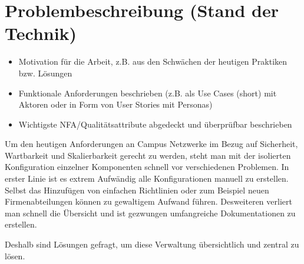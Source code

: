 \section{Problembeschreibung (Stand der Technik)}

\begin{itemize}	
	\item Motivation für die Arbeit, z.B. aus den Schwächen der heutigen Praktiken bzw. Lösungen
	\item Funktionale Anforderungen beschrieben (z.B. als Use Cases (short) mit Aktoren oder in Form von User Stories mit Personas)
	\item Wichtigste NFA/Qualitätsattribute abgedeckt und überprüfbar beschrieben
\end{itemize}

Um den heutigen Anforderungen an Campus Netzwerke im Bezug auf Sicherheit, Wartbarkeit und Skalierbarkeit gerecht zu werden, steht man mit der isolierten Konfiguration einzelner Komponenten schnell vor verschiedenen Problemen. In erster Linie ist es extrem Aufwändig alle Konfigurationen manuell zu erstellen. Selbst das Hinzufügen von einfachen Richtlinien oder zum Beispiel neuen Firmenabteilungen können zu gewaltigem Aufwand führen. Desweiteren verliert man schnell die Übersicht und ist gezwungen umfangreiche Dokumentationen zu erstellen.

Deshalb sind Lösungen gefragt, um diese Verwaltung übersichtlich und zentral zu lösen. 



